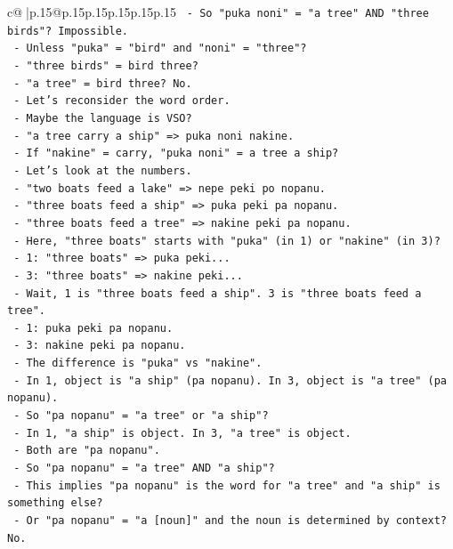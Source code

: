 \documentclass{article}
\begin{document}
{\begin{supertabular}{c@{$\;$}|p{.15\linewidth}@{}p{.15\linewidth}p{.15\linewidth}p{.15\linewidth}p{.15\linewidth}p{.15\linewidth}}
{{{\texttt{  {-} So "puka noni" = "a tree" AND "three birds"? Impossible.} \\
\texttt{  {-} Unless "puka" = "bird" and "noni" = "three"?} \\
\texttt{  {-} "three birds" = bird three?} \\
\texttt{  {-} "a tree" = bird three? No.} \\
\texttt{  {-} Let's reconsider the word order.} \\
\texttt{  {-} Maybe the language is VSO?} \\
\texttt{  {-} "a tree carry a ship" => puka noni nakine.} \\
\texttt{  {-} If "nakine" = carry, "puka noni" = a tree a ship?} \\
\texttt{  {-} Let's look at the numbers.} \\
\texttt{  {-} "two boats feed a lake" => nepe peki po nopanu.} \\
\texttt{  {-} "three boats feed a ship" => puka peki pa nopanu.} \\
\texttt{  {-} "three boats feed a tree" => nakine peki pa nopanu.} \\
\texttt{  {-} Here, "three boats" starts with "puka" (in 1) or "nakine" (in 3)?} \\
\texttt{  {-} 1: "three boats" => puka peki...} \\
\texttt{  {-} 3: "three boats" => nakine peki...} \\
\texttt{  {-} Wait, 1 is "three boats feed a ship". 3 is "three boats feed a tree".} \\
\texttt{  {-} 1: puka peki pa nopanu.} \\
\texttt{  {-} 3: nakine peki pa nopanu.} \\
\texttt{  {-} The difference is "puka" vs "nakine".} \\
\texttt{  {-} In 1, object is "a ship" (pa nopanu). In 3, object is "a tree" (pa nopanu).} \\
\texttt{  {-} So "pa nopanu" = "a tree" or "a ship"?} \\
\texttt{  {-} In 1, "a ship" is object. In 3, "a tree" is object.} \\
\texttt{  {-} Both are "pa nopanu".} \\
\texttt{  {-} So "pa nopanu" = "a tree" AND "a ship"?} \\
\texttt{  {-} This implies "pa nopanu" is the word for "a tree" and "a ship" is something else?} \\
\texttt{  {-} Or "pa nopanu" = "a {[}noun{]}" and the noun is determined by context? No.} \\
}}}
\end{supertabular}}
\end{document}
